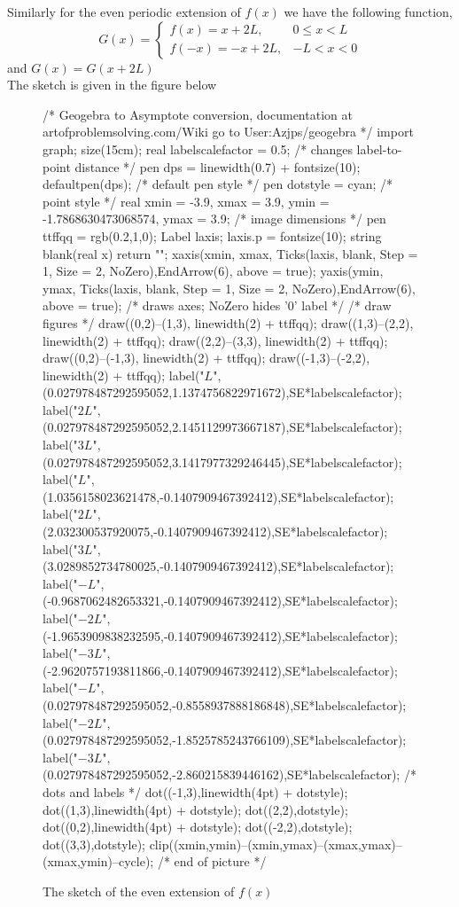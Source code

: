 \documentclass[12pt]{scrartcl}
\begin{document}
\begin{soln}
Similarly for the even periodic extension of $f(x)$ we have the following function,
\begin{equation*}
	G(x) = \begin{cases}
	f(x) = x + 2L, & 0 \le x < L \\
	f(-x) = -x + 2L, & -L < x < 0
\end{cases}
\end{equation*}
and $G(x) = G(x + 2L)$ \\
The sketch is given in the figure below
\begin{figure}[H]
	\centering
	\begin{asy}
		 /* Geogebra to Asymptote conversion, documentation at artofproblemsolving.com/Wiki go to User:Azjps/geogebra */
		import graph; size(15cm); 
		real labelscalefactor = 0.5; /* changes label-to-point distance */
		pen dps = linewidth(0.7) + fontsize(10); defaultpen(dps); /* default pen style */ 
		pen dotstyle = cyan; /* point style */ 
		real xmin = -3.9, xmax = 3.9, ymin = -1.7868630473068574, ymax = 3.9;  /* image dimensions */
		pen ttffqq = rgb(0.2,1,0); 
		Label laxis; laxis.p = fontsize(10); 
		string blank(real x) {return "";} 
		xaxis(xmin, xmax, Ticks(laxis, blank, Step = 1, Size = 2, NoZero),EndArrow(6), above = true); 
		yaxis(ymin, ymax, Ticks(laxis, blank, Step = 1, Size = 2, NoZero),EndArrow(6), above = true); /* draws axes; NoZero hides '0' label */ 
		/* draw figures */
		draw((0,2)--(1,3), linewidth(2) + ttffqq); 
		draw((1,3)--(2,2), linewidth(2) + ttffqq); 
		draw((2,2)--(3,3), linewidth(2) + ttffqq); 
		draw((0,2)--(-1,3), linewidth(2) + ttffqq); 
		draw((-1,3)--(-2,2), linewidth(2) + ttffqq); 
		label("$L$",(0.027978487292595052,1.1374756822971672),SE*labelscalefactor); 
		label("$2L$",(0.027978487292595052,2.1451129973667187),SE*labelscalefactor); 
		label("$3L$",(0.027978487292595052,3.1417977329246445),SE*labelscalefactor); 
		label("$L$",(1.0356158023621478,-0.1407909467392412),SE*labelscalefactor); 
		label("$2L$",(2.032300537920075,-0.1407909467392412),SE*labelscalefactor); 
		label("$3L$",(3.0289852734780025,-0.1407909467392412),SE*labelscalefactor); 
		label("$-L$",(-0.9687062482653321,-0.1407909467392412),SE*labelscalefactor); 
		label("$-2L$",(-1.9653909838232595,-0.1407909467392412),SE*labelscalefactor); 
		label("$-3L$",(-2.9620757193811866,-0.1407909467392412),SE*labelscalefactor); 
		label("$-L$",(0.027978487292595052,-0.8558937888186848),SE*labelscalefactor); 
		label("$-2L$",(0.027978487292595052,-1.8525785243766109),SE*labelscalefactor); 
		label("$-3L$",(0.027978487292595052,-2.860215839446162),SE*labelscalefactor); 
		/* dots and labels */
		dot((-1,3),linewidth(4pt) + dotstyle); 
		dot((1,3),linewidth(4pt) + dotstyle); 
		dot((2,2),dotstyle); 
		dot((0,2),linewidth(4pt) + dotstyle); 
		dot((-2,2),dotstyle); 
		dot((3,3),dotstyle); 
		clip((xmin,ymin)--(xmin,ymax)--(xmax,ymax)--(xmax,ymin)--cycle); 
		/* end of picture */
	\end{asy}
	\caption{The sketch of the even extension of $f(x)$}
\end{figure}


\end{soln}
\end{document}
